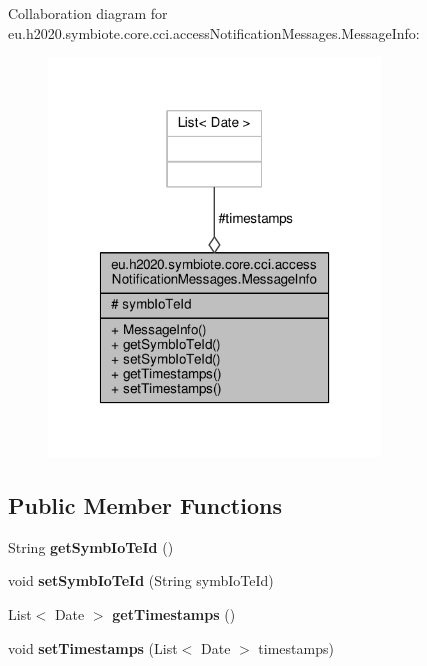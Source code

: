 Collaboration diagram for eu.\+h2020.\+symbiote.\+core.\+cci.\+access\+Notification\+Messages.\+Message\+Info\+:\nopagebreak
\begin{figure}[H]
\begin{center}
\leavevmode
\includegraphics[width=250pt]{classeu_1_1h2020_1_1symbiote_1_1core_1_1cci_1_1accessNotificationMessages_1_1MessageInfo__coll__graph}
\end{center}
\end{figure}
\subsection*{Public Member Functions}
\begin{DoxyCompactItemize}
\item 
\mbox{\label{classeu_1_1h2020_1_1symbiote_1_1core_1_1cci_1_1accessNotificationMessages_1_1MessageInfo_aa826f4b97f195676e5fc3932af2d49a0}} 
String {\bfseries get\+Symb\+Io\+Te\+Id} ()
\item 
\mbox{\label{classeu_1_1h2020_1_1symbiote_1_1core_1_1cci_1_1accessNotificationMessages_1_1MessageInfo_ad4c77b9e73ab0c3a8fa992875b70e1e9}} 
void {\bfseries set\+Symb\+Io\+Te\+Id} (String symb\+Io\+Te\+Id)
\item 
\mbox{\label{classeu_1_1h2020_1_1symbiote_1_1core_1_1cci_1_1accessNotificationMessages_1_1MessageInfo_a8d4a9a8d426f70d7029868cbc14de97b}} 
List$<$ Date $>$ {\bfseries get\+Timestamps} ()
\item 
\mbox{\label{classeu_1_1h2020_1_1symbiote_1_1core_1_1cci_1_1accessNotificationMessages_1_1MessageInfo_a7504d132265fba1a82c03f8abb8a07e8}} 
void {\bfseries set\+Timestamps} (List$<$ Date $>$ timestamps)
\end{DoxyCompactItemize}
